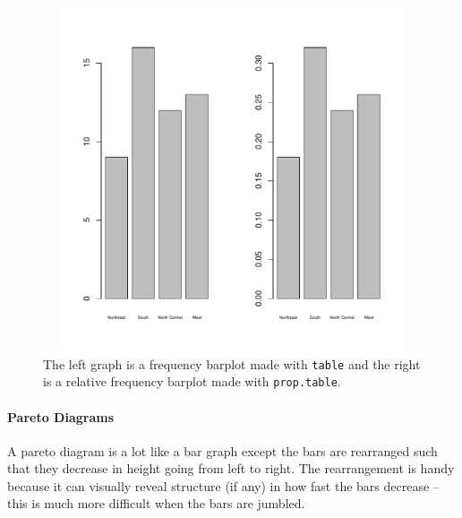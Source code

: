 \documentclass[captions=tableheading]{scrbook}
\begin{document}
\begin{example}
\begin{figure}[th]
    \includegraphics[width=5in, height=4in]{img/bar-gr-stateregion.pdf}
    \caption[Bar graphs of the \texttt{state.region} data]{\small The left graph is a frequency barplot made with \texttt{table} and the right is a relative frequency barplot made with \texttt{prop.table}.}
    \label{fig:bar-gr-stateregion}
  \end{figure}

\end{example}



\paragraph*{Pareto Diagrams}
\label{par:Pareto-Diagrams}

A pareto diagram is a lot like a bar graph except the bars are rearranged such that they decrease in height going from left to right. The rearrangement is handy because it can visually reveal structure (if any) in how fast the bars decrease -- this is much more difficult when the bars are jumbled. 
\end{document}
